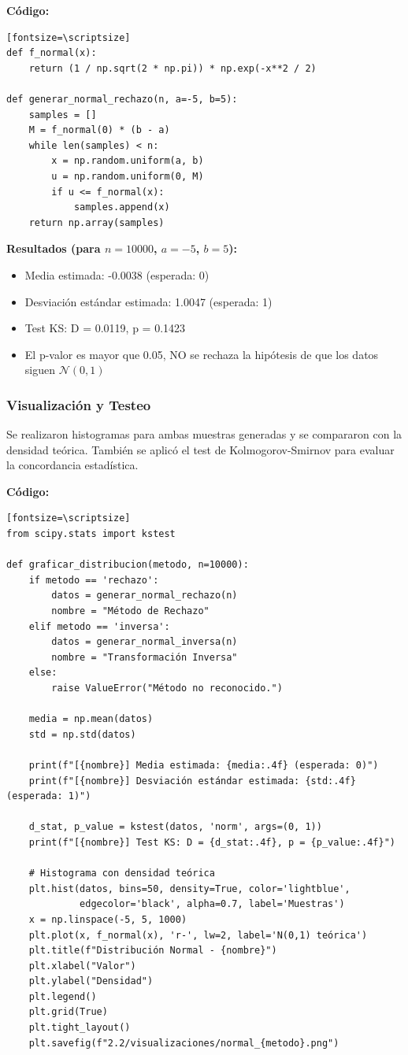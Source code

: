 \documentclass{article}
\begin{document}
\textbf{Código:}
\begin{verbatim}[fontsize=\scriptsize]
def f_normal(x):
    return (1 / np.sqrt(2 * np.pi)) * np.exp(-x**2 / 2)

def generar_normal_rechazo(n, a=-5, b=5):
    samples = []
    M = f_normal(0) * (b - a)
    while len(samples) < n:
        x = np.random.uniform(a, b)
        u = np.random.uniform(0, M)
        if u <= f_normal(x):
            samples.append(x)
    return np.array(samples)
\end{verbatim}

\textbf{Resultados (para $n=10000$, $a=-5$, $b=5$):}
\begin{itemize}
    \item Media estimada: -0.0038 (esperada: 0)
    \item Desviación estándar estimada: 1.0047 (esperada: 1)
    \item Test KS: D = 0.0119, p = 0.1423
    \item El p-valor es mayor que 0.05, NO se rechaza la hipótesis de que los datos siguen $\mathcal{N}(0,1)$
\end{itemize}

\vspace{0.5em}
\subsubsection{Visualización y Testeo}

Se realizaron histogramas para ambas muestras generadas y se compararon con la densidad teórica. También se aplicó el test de Kolmogorov-Smirnov para evaluar la concordancia estadística.

\textbf{Código:}
\begin{verbatim}[fontsize=\scriptsize]
from scipy.stats import kstest

def graficar_distribucion(metodo, n=10000):
    if metodo == 'rechazo':
        datos = generar_normal_rechazo(n)
        nombre = "Método de Rechazo"
    elif metodo == 'inversa':
        datos = generar_normal_inversa(n)
        nombre = "Transformación Inversa"
    else:
        raise ValueError("Método no reconocido.")

    media = np.mean(datos)
    std = np.std(datos)

    print(f"[{nombre}] Media estimada: {media:.4f} (esperada: 0)")
    print(f"[{nombre}] Desviación estándar estimada: {std:.4f} (esperada: 1)")

    d_stat, p_value = kstest(datos, 'norm', args=(0, 1))
    print(f"[{nombre}] Test KS: D = {d_stat:.4f}, p = {p_value:.4f}")

    # Histograma con densidad teórica
    plt.hist(datos, bins=50, density=True, color='lightblue',
             edgecolor='black', alpha=0.7, label='Muestras')
    x = np.linspace(-5, 5, 1000)
    plt.plot(x, f_normal(x), 'r-', lw=2, label='N(0,1) teórica')
    plt.title(f"Distribución Normal - {nombre}")
    plt.xlabel("Valor")
    plt.ylabel("Densidad")
    plt.legend()
    plt.grid(True)
    plt.tight_layout()
    plt.savefig(f"2.2/visualizaciones/normal_{metodo}.png")
\end{verbatim}
\end{document}
